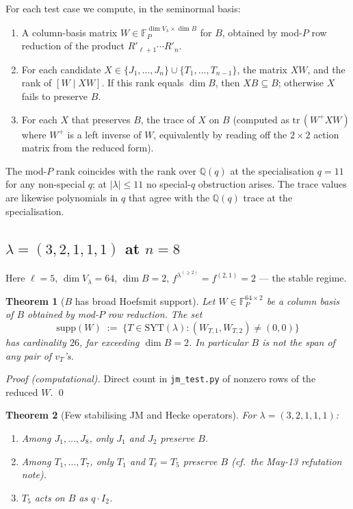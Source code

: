 \documentclass[11pt]{article}
\newtheorem{theorem}{Theorem}
\theoremstyle{definition}
\begin{document}
For each test case we compute, in the seminormal basis:
\begin{enumerate}[label=(\arabic*),topsep=0.2em,itemsep=0.1em]
\item A column-basis matrix $W \in \mathbb{F}_P^{\dim V_\lambda \times \dim B}$
  for $B$, obtained by mod-$P$ row reduction of the product
  $R'_{\ell+1} \cdots R'_n$.
\item For each candidate $X \in \{J_1, \ldots, J_n\} \cup \{T_1,
  \ldots, T_{n-1}\}$, the matrix $X W$, and the rank of $[W \mid X W]$.
  If this rank equals $\dim B$, then $X B \subseteq B$; otherwise $X$
  fails to preserve $B$.
\item For each $X$ that preserves $B$, the trace of $X$ on $B$
  (computed as $\mathrm{tr}\,(W^+ X W)$ where $W^+$ is a left inverse
  of $W$, equivalently by reading off the $2 \times 2$ action matrix
  from the reduced form).
\end{enumerate}
The mod-$P$ rank coincides with the rank over $\mathbb{Q}(q)$ at the
specialisation $q = 11$ for any non-special $q$; at $|\lambda| \le 11$
no special-$q$ obstruction arises. The trace values are likewise
polynomials in $q$ that agree with the $\mathbb{Q}(q)$ trace at the
specialisation.

\subsection{$\lambda = (3,2,1,1,1)$ at $n = 8$}\label{ssec:n8}

Here $\ell = 5$, $\dim V_\lambda = 64$, $\dim B = 2$, $f^{\lambda^{(\ge 2)}} =
f^{(2,1)} = 2$ --- the stable regime.

\begin{theorem}[$B$ has broad Hoefsmit support]\label{thm:support8}
Let $W \in \mathbb{F}_P^{64 \times 2}$ be a column basis of $B$
obtained by mod-$P$ row reduction. The set
\[
   \mathrm{supp}(W) \;:=\; \{T \in \mathrm{SYT}(\lambda) : (W_{T,1}, W_{T,2}) \ne (0,0)\}
\]
has cardinality $26$, far exceeding $\dim B = 2$. In particular $B$ is
\emph{not} the span of any pair of $v_T$'s.
\end{theorem}

\begin{proof}[Proof (computational)]
Direct count in \texttt{jm\_test.py} of nonzero rows of the reduced $W$.
\qed
\end{proof}

\begin{theorem}[Few stabilising JM and Hecke operators]\label{thm:stab8}
For $\lambda = (3,2,1,1,1)$:
\begin{enumerate}[label=(\roman*),topsep=0.2em,itemsep=0.1em]
\item Among $J_1, \ldots, J_8$, only $J_1$ and $J_2$ preserve $B$.
\item Among $T_1, \ldots, T_7$, only $T_1$ and $T_\ell = T_5$ preserve $B$
   (cf.\ the May-13 refutation note).
\item $T_5$ acts on $B$ as $q \cdot I_2$.
\end{enumerate}
\end{theorem}
\end{document}

